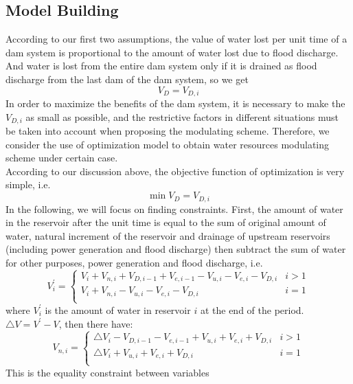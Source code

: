 \documentclass{mcmthesis}
\begin{document}
\subsection{Model Building}
\indent According to our first two assumptions, the value of water lost per unit time of a dam system is proportional to the amount of water lost due to flood discharge. And water is lost from the entire dam system only if it is drained as flood discharge from the last dam of the dam system, so we get
\begin{equation}
V_{D} = V_{D,i}
\end{equation}
\indent In order to maximize the benefits of the dam system, it is necessary to make the $ V_ {D, i} $ as small as possible, and the restrictive factors in different situations must be taken into account when proposing the modulating scheme. Therefore, we consider the use of optimization model to obtain water resources modulating scheme under certain case. \\
\indent According to our discussion above, the objective function of optimization is very simple, i.e.
\begin{equation}
\min V_{D} = V_{D, i}
\end{equation}
\indent In the following, we will focus on finding constraints. First, the amount of water in the reservoir after the unit time is equal to the sum of original amount of water, natural increment of the reservoir and drainage of upstream reservoirs (including power generation and flood discharge) then subtract the sum of water for other purposes, power generation and flood discharge, i.e.
\begin{equation} V_{i}^{'} =
\left\{
\begin{array}{cc}
 V_{i} + V_{n, i} + V_{D, i - 1} + V_{e, i - 1} - V_{u, i} - V_{e, i} - V_{D, i} & i > 1 \\
V_{i} + V_{n, i} - V_{u, i} - V_{e, i} - V_{D, i} & i = 1 \\
\end{array}
\right.
\end{equation}
where $ V_ {i} ^ {'} $ is the amount of water in reservoir $ i $ at the end of the period. 
$\triangle V = V ^ {'} - V $, then there have:
\begin{equation}
V_{n, i} =
\left\{
\begin{array}{cc}
\triangle V_{i} - V_{D, i - 1} - V_{e, i - 1} + V_{u, i} + V_{e, i} + V_{D, i} & i > 1 \\
\triangle V_{i} + V_{u, i} + V_{e, i} + V_{D, i}& i = 1 \\
\end{array}
\right.
\end{equation}
This is the equality constraint between variables
\end{document}
